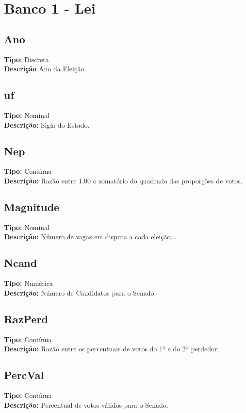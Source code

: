 \documentclass{article}\usepackage[]{graphicx}\usepackage[]{color}
\begin{document}
	\section{Banco 1 - Lei}

		\subsection{Ano}
		{\bf Tipo:} Discreta \\
		{\bf Descrição} Ano da Eleição \\
		\subsection{uf}
		{\bf Tipo:} Nominal \\
		{\bf Descrição:} Sigla do Estado.
		\subsection{Nep}
		{\bf Tipo:} Contínua \\
		{\bf Descrição:} Razão entre 1.00 o somatório do quadrado das proporções de votos.\\


		\subsection{Magnitude}
		{\bf Tipo:} Nominal \\
		{\bf Descrição:} Número de vagas em disputa a cada eleição.
		.
		\subsection{Ncand}
		{\bf Tipo:} Numérica \\
		{\bf Descrição:} Número de Candidatos para o Senado.\\

		\subsection{RazPerd}
		{\bf Tipo:} Contínua \\
		{\bf Descrição:} Razão entre os percentuais de votos do 1º e do 2º perdedor.\\



		\subsection{PercVal}
		{\bf Tipo:} Contínua \\
		{\bf Descrição:} Percentual de votos válidos para o Senado.\\
\end{document}
